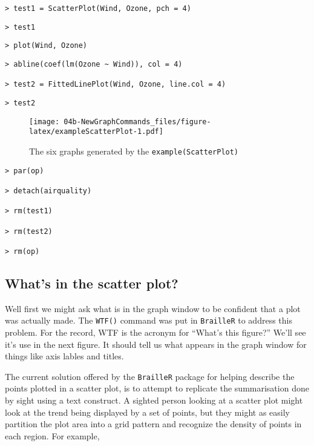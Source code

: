 \documentclass[
]{book}
\begin{document}
\begin{verbatim}
> test1 = ScatterPlot(Wind, Ozone, pch = 4)
\end{verbatim}

\begin{verbatim}
> test1
\end{verbatim}

\begin{verbatim}
> plot(Wind, Ozone)
\end{verbatim}

\begin{verbatim}
> abline(coef(lm(Ozone ~ Wind)), col = 4)

> test2 = FittedLinePlot(Wind, Ozone, line.col = 4)
\end{verbatim}

\begin{verbatim}
> test2
\end{verbatim}

\begin{figure}
\centering
\texttt{[image: 04b-NewGraphCommands\_files/figure-latex/exampleScatterPlot-1.pdf]}
\caption{\label{fig:exampleScatterPlot}The six graphs generated by the \texttt{example(ScatterPlot)}}
\end{figure}

\begin{verbatim}
> par(op)

> detach(airquality)

> rm(test1)

> rm(test2)

> rm(op)
\end{verbatim}

\hypertarget{whats-in-the-scatter-plot}{%
\subsection{What's in the scatter plot?}\label{whats-in-the-scatter-plot}}

Well first we might ask what is in the graph window to be confident that a plot was actually made. The \texttt{WTF()} command was put in \texttt{BrailleR} to address this problem. For the record, WTF is the acronym for ``What's this figure?'' We'll see it's use in the next figure. It should tell us what appears in the graph window for things like axis lables and titles.

The current solution offered by the \texttt{BrailleR} package for helping describe the points plotted in a scatter plot, is to attempt to replicate the summarisation done by sight using a text construct. A sighted person looking at a scatter plot might look at the trend being displayed by a set of points, but they might as easily partition the plot area into a grid pattern and recognize the density of points in each region. For example,
\end{document}
